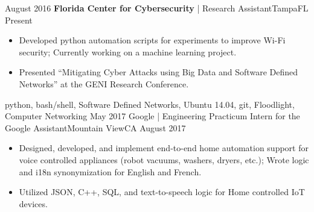 %
%
%
\begin{experiences}
  \experience
    {August 2016} {\textbf{Florida Center for Cybersecurity} | Research Assistant}{Tampa}{FL}
    {Present} {
                      \begin{itemize}
                        \item Developed python automation scripts for experiments to improve Wi-Fi security; Currently working on a machine learning project.        
                        \item Presented “Mitigating Cyber Attacks using Big Data and Software Defined Networks” at the GENI Research Conference.                                                           
                      \end{itemize}
                    }
                    {python, bash/shell, Software Defined Networks, Ubuntu 14.04, git, Floodlight, Computer Networking}
  \emptySeparator
  \experience
    {May 2017} {Google | Engineering Practicum Intern for the Google Assistant}{Mountain View}{CA}
    {August 2017}    {
                      \begin{itemize}
                        \item Designed, developed, and implement end-to-end home automation support for voice controlled appliances (robot vacuums, washers, dryers, etc.); Wrote logic and i18n synonymization for English and French.
						\item Utilized JSON, C++, SQL, and text-to-speech logic for Home controlled IoT devices.

\end{itemize}}
\end{experiences}
